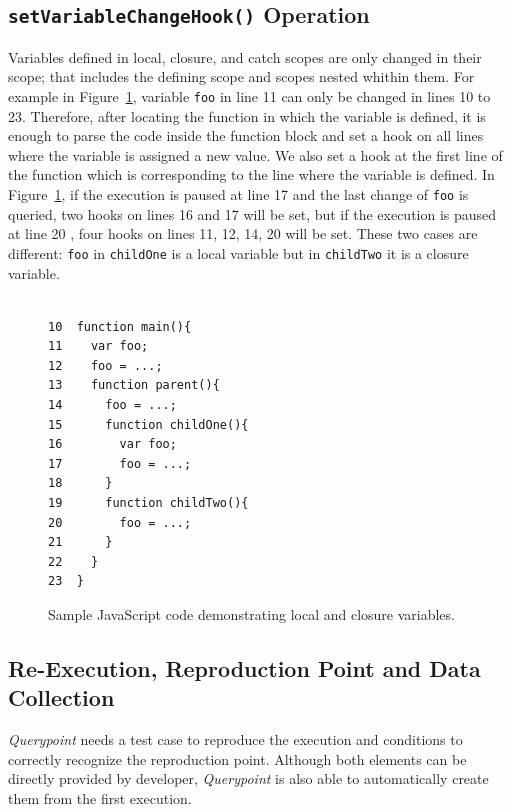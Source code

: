\documentclass{sig-alternate}
\begin{document}
\subsection{{\normalsize\bf\texttt{setVariableChangeHook()}} Operation}
Variables defined in local, closure, and catch scopes are only changed in
their scope; that includes the defining scope and scopes nested whithin them.
For example in Figure~\ref{fig:js-closure}, variable \texttt{foo} in line 11 can only be
changed in lines 10 to 23. Therefore, after locating the function in
which the variable is defined, it is enough to parse the code inside
the function block and set a hook on all lines where the variable is
assigned a new value. 
We also set a hook at the first line of the function which is
corresponding to the line where the variable is defined. In Figure~\ref{fig:js-closure}, 
if the execution is paused at line 17 and the
last change of \texttt{foo} is queried, two hooks on lines 16 and 17
will be set, but if the execution is paused at line 20 , four hooks on
lines 11, 12, 14, 20 will be set. These two cases are different: \texttt{foo} in 
\texttt{childOne} is a local variable
but in \texttt{childTwo} it is a closure variable.

\begin{figure}[htp]
\lstset{basicstyle=\scriptsize}
\begin{lstlisting}[frame=single, language=myLang]%, framerule=0pt]

10  function main(){
11    var foo;
12    foo = ...;
13    function parent(){
14      foo = ...;
15      function childOne(){
16        var foo;
17        foo = ...;
18      }  
19      function childTwo(){
20        foo = ...;			      
21      }
22    }  
23  }    
\end{lstlisting}
\caption{Sample JavaScript code demonstrating local and closure variables.}
\label{fig:js-closure}
\end{figure}

\subsection{Re-Execution, Reproduction Point and Data Collection}
\textit{Querypoint} needs a test case to reproduce the
execution and conditions to correctly recognize the reproduction point. 
Although both elements can be directly provided by developer, \textit{Querypoint}
is also able to automatically create them from the first execution. 
\end{document}
